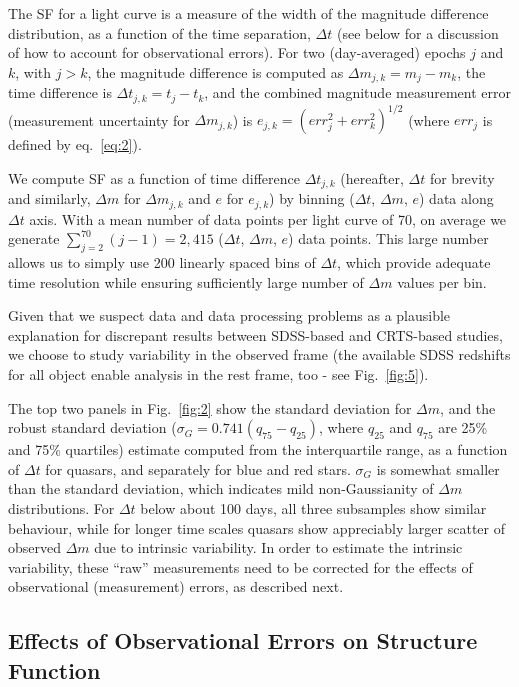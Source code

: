 \documentclass[fleqn,usenatbib]{mnras}
\begin{document}
The SF for a light curve is a measure of the width of the magnitude difference distribution, as a function of the time separation, $\Delta t$ (see below for a discussion of how to account for observational errors). For two (day-averaged) epochs $j$ and $k$,  with $j > k$, the magnitude difference is computed as $\Delta m_{j,k} = m_{j} - m_{k}$, the time difference is  $\Delta t_{j,k} = t_{j} - t_{k}$, and  the combined magnitude measurement error (measurement uncertainty for $\Delta m_{j,k}$) is $e_{j,k} = (err_{j}^{2} + err_{k}^{2})^{1/2}$ (where $err_{j}$ is defined by eq.~\ref{eq:2}). 

We compute SF as a function of time difference $\Delta t_{j,k}$ (hereafter, $\Delta t$ for brevity and similarly, $\Delta m$ for $\Delta m_{j,k}$ and $e$ for $e_{j,k}$) by binning ($\Delta t$, $\Delta m$, $e$) data along $\Delta t$ axis.  With a mean number of data points per light curve of  70, on average we generate $\sum_{j=2}^{70}{(j-1)} = 2,415$  ($\Delta t$, $\Delta m$, $e$) data points. This large number allows us  to simply use 200 linearly spaced bins of $\Delta t$, which provide adequate time resolution while ensuring sufficiently large number of  $\Delta m$ values per bin.

Given that we suspect data and data processing problems as a plausible explanation for discrepant
results between SDSS-based and CRTS-based studies, we choose to study variability in the observed frame (the available SDSS
redshifts for all object enable analysis in the rest frame, too - see Fig.~\ref{fig:5}). 

The top two panels in Fig.~\ref{fig:2} show the standard deviation for $\Delta m$, and the robust standard 
deviation ($\sigma_G=0.741 (q_{75} - q_{25})$, where $q_{25}$ and $q_{75}$ are 25\% and 75\% quartiles) 
estimate computed from the interquartile range, as a function of $\Delta t$ for quasars, and 
separately for blue and red stars. $\sigma_G$ is somewhat smaller than the standard deviation, which indicates mild 
non-Gaussianity of $\Delta m$ distributions. For $\Delta t$ below about 100 days, all three subsamples 
show similar behaviour, while for longer time scales quasars show appreciably larger scatter of observed 
$\Delta m$ due to intrinsic variability. In order to estimate the intrinsic variability, these ``raw'' 
measurements need to be corrected for the effects of observational (measurement) errors, as described next.



\subsection{Effects of Observational Errors on Structure Function}
\end{document}

